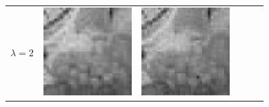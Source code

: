 \documentclass[11pt,a4paper,openright,oneside]{book}
\numberwithin{equation}{section}
\begin{document}
{\begin{figure}[h]
\begin{adjustwidth}{-3cm}{-3cm}
\begin{tabular}{>{\centering\arraybackslash}m{1.5cm} m{2.5cm} m{2.5cm} m{2.5cm} m{2.5cm} m{2.5cm}}
        $\lambda = 2$ &
        \includegraphics[width=\linewidth]{media/tnale/AAAfruits-comp1-ale-2.png} &
        \includegraphics[width=\linewidth]{media/tnale/AAAfruits-comp2-ale-2.png} &

\end{tabular}
\end{adjustwidth}
\end{figure}}
\end{document}
